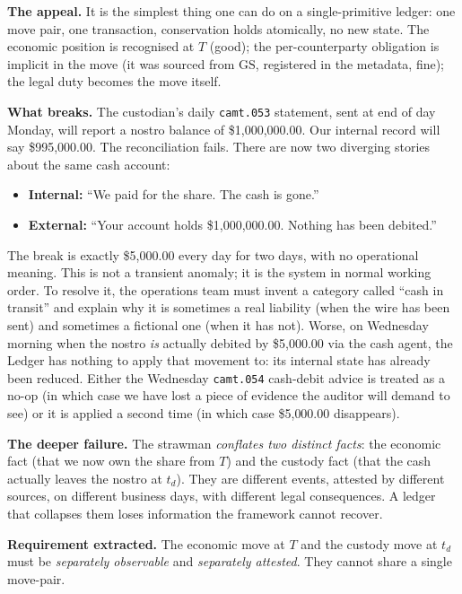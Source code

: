 \documentclass[11pt,a4paper]{article}
\begin{document}
\textbf{The appeal.} It is the simplest thing one can do on a single-primitive ledger: one move pair, one transaction, conservation holds atomically, no new state. The economic position is recognised at $T$ (good); the per-counterparty obligation is implicit in the move (it was sourced from $\mathrm{GS}$, registered in the metadata, fine); the legal duty becomes the move itself.

\textbf{What breaks.} The custodian's daily \texttt{camt.053} statement, sent at end of day Monday, will report a nostro balance of \$1{,}000{,}000.00. Our internal record will say \$995{,}000.00. The reconciliation fails. There are now two diverging stories about the same cash account:
\begin{itemize}[nosep]
\item \textbf{Internal:} ``We paid for the share. The cash is gone.''
\item \textbf{External:} ``Your account holds \$1{,}000{,}000.00. Nothing has been debited.''
\end{itemize}

The break is exactly \$5{,}000.00 every day for two days, with no operational meaning. This is not a transient anomaly; it is the system in normal working order. To resolve it, the operations team must invent a category called ``cash in transit'' and explain why it is sometimes a real liability (when the wire has been sent) and sometimes a fictional one (when it has not). Worse, on Wednesday morning when the nostro \emph{is} actually debited by \$5{,}000.00 via the cash agent, the Ledger has nothing to apply that movement to: its internal state has already been reduced. Either the Wednesday \texttt{camt.054} cash-debit advice is treated as a no-op (in which case we have lost a piece of evidence the auditor will demand to see) or it is applied a second time (in which case \$5{,}000.00 disappears).

\textbf{The deeper failure.} The strawman \emph{conflates two distinct facts}: the economic fact (that we now own the share from $T$) and the custody fact (that the cash actually leaves the nostro at $t_d$). They are different events, attested by different sources, on different business days, with different legal consequences. A ledger that collapses them loses information the framework cannot recover.

\textbf{Requirement extracted.} The economic move at $T$ and the custody move at $t_d$ must be \emph{separately observable} and \emph{separately attested}. They cannot share a single move-pair.
\end{document}
